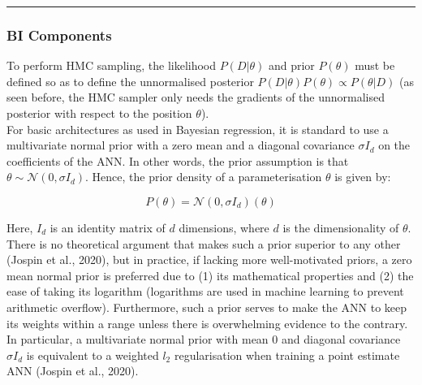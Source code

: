 \documentclass[conference]{IEEEtran}
\begin{document}
\par\noindent\rule{0.49\textwidth}{0.1pt}

\subsubsection{BI Components}
To perform HMC sampling, the likelihood $P(D|\theta)$ and prior $P(\theta)$ must be defined so as to define the unnormalised posterior $P(D|\theta)P(\theta) \propto P(\theta|D)$ (as seen before, the HMC sampler only needs the gradients of the unnormalised posterior with respect to the position $\theta$).\\

For basic architectures as used in Bayesian regression, it is standard to use a multivariate normal prior with a zero mean and a diagonal covariance $\sigma I_d$ on the coefficients of the ANN. In other words, the prior assumption is that $\theta \sim \mathcal{N}(0, \sigma I_d)$. Hence, the prior density of a parameterisation $\theta$ is given by:

\begin{equation*}
	P(\theta) = \mathcal{N}(0, \sigma I_d)(\theta)
\end{equation*}

Here, $I_d$ is an identity matrix of $d$ dimensions, where $d$ is the dimensionality of $\theta$. There is no theoretical argument that makes such a prior superior to any other (Jospin et al., 2020), but in practice, if lacking more well-motivated priors, a zero mean normal prior is preferred due to (1) its mathematical properties and (2) the ease of taking its logarithm (logarithms are used in machine learning to prevent arithmetic overflow). Furthermore, such a prior serves to make the ANN to keep its weights within a range unless there is overwhelming evidence to the contrary. In particular, a multivariate normal prior with mean $0$ and diagonal covariance $\sigma I_d$ is equivalent to a weighted $l_2$ regularisation when training a point estimate ANN (Jospin et al., 2020).\\
\end{document}

